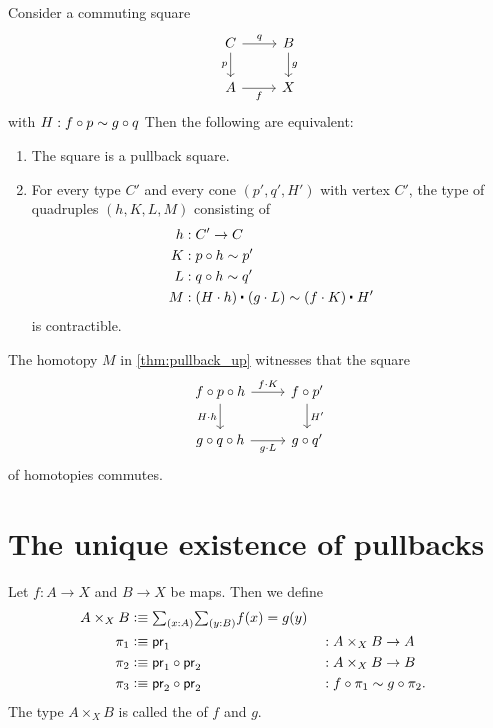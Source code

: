 \begin{thm}\label{thm:pullback_up}
Consider a commuting square
\begin{equation*}
\begin{tikzcd}
C \arrow[r,"q"] \arrow[d,swap,"p"] & B \arrow[d,"g"] \\
A \arrow[r,swap,"f"] & X
\end{tikzcd}
\end{equation*}
with $H:f\circ p\sim g\circ q$
Then the following are equivalent:
\begin{enumerate}
\item The square is a pullback square.
\item For every type $C'$ and every cone $(p',q',H')$ with vertex $C'$, the type of quadruples $(h,K,L,M)$ consisting of
\begin{align*}
h & : C'\to C \\
K & : p\circ h \htpy p' \\
L & : q\circ h \htpy q' \\
M & : \ct{(H\cdot h)}{(g\cdot L)} \htpy \ct{(f\cdot K)}{H'}
\end{align*}
is contractible.
\end{enumerate}
\end{thm}

\begin{rmk}
The homotopy $M$ in \cref{thm:pullback_up} witnesses that the square
\begin{equation*}
\begin{tikzcd}
f\circ p\circ h \arrow[r,"f\cdot K"] \arrow[d,swap,"H\cdot h"] & f\circ p' \arrow[d,"{H'}"] \\
g\circ q\circ h \arrow[r,swap,"g\cdot L"] & g\circ q'
\end{tikzcd}
\end{equation*}
of homotopies commutes.
\end{rmk}

\section{The unique existence of pullbacks}

\begin{defn}
Let $f:A\to X$ and $B\to X$ be maps. Then we define
\begin{align*}
A\times_X B & \defeq \sm{x:A}{y:B}f(x)=g(y) \\
\pi_1 & \defeq \proj 1 & & : A\times_X B\to A \\
\pi_2 & \defeq \proj 1\circ\proj 2 & & : A\times_X B\to B\\
\pi_3 & \defeq \proj 2\circ\proj 2 & & : f\circ \pi_1 \htpy g\circ\pi_2.
\end{align*}
The type $A\times_X B$ is called the  of $f$ and $g$.
\end{defn}

